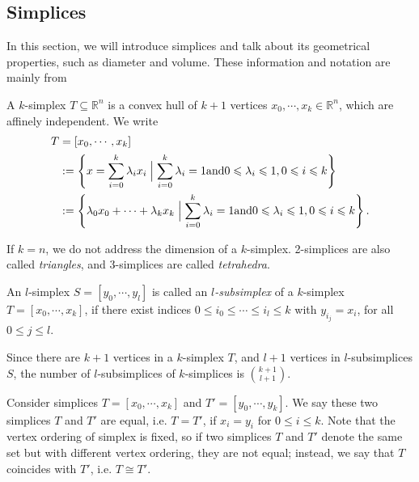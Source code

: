     \subsection{Simplices}
    In this section, we will introduce simplices and talk about its geometrical properties, such as diameter and volume. These information and notation are mainly from \cite{ciarlet2002finite}\cite{bey2000simplicial}
    \noindent
    \begin{definition*}
    A $k$-simplex $T \subseteq\mathbb{R}^n$ is a convex hull of $k+1$ vertices ${x}_0, \cdots, {x}_k \in \mathbb{R}^n$, which are affinely independent. We write 
    \begin{equation*}
    \begin{split}
    {T} & = [{x}_0, \cdots, {x}_k ]\\
    & := \left\{{x} = \sum\limits_{i=0}^k \lambda_i {x}_i \Bigm| \sum\limits_{i=0}^k \lambda_i = 1 \text{and} 0 \leqslant \lambda_i \leqslant 1, 0 \leqslant i \leqslant k \right\}\\
    & := \left\{\lambda_0{x}_0 + \cdots + \lambda_k{x}_k \Bigm| \sum\limits_{i=0}^k \lambda_i = 1 \text{and} 0 \leqslant \lambda_i \leqslant 1, 0 \leqslant i \leqslant k \right\}.
    \end{split}
    \end{equation*}
    \end{definition*}
    If $k = n$, we do not address the dimension of a $k$-simplex. 2-simplices are also called \emph{triangles}, and 3-simplices are called \emph{tetrahedra}.

    \begin{definition*}
    An  $l$-simplex ${S} = [{y}_0, \cdots, {y}_l]$ is called an \emph{$l$-subsimplex} of a $k$-simplex ${T} = [{x}_0, \cdots, {x}_k]$, if there exist indices $0 \leqslant {i}_0 \leqslant \cdots\leqslant{i}_l \leqslant k$ with ${y}_{i_{j}} = {x}_i$, for all $0 \leqslant j \leqslant l$.
    \end{definition*}
    Since there are $k+1$ vertices in a $k$-simplex $T$, and $l+1$ vertices in $l$-subsimplices $S$, the number of $l$-subsimplices of $k$-simplices is $\binom{k+1}{l+1}$.


    Consider simplices $T = [{x}_0, \cdots, {x}_k]$ and $T' = [{y}_0, \cdots, {y}_k]$. We say these two simplices $T$ and $T'$ are equal, i.e. $T = T'$, if ${x}_i = {y}_i$ for $0 \leqslant i \leqslant k$. Note that the vertex ordering of simplex is fixed, so if two simplices $T$ and $T'$ denote the same set but with different vertex ordering, they are not equal; instead, we say that ${T}$ coincides with $T'$, i.e. $T \cong T'$.

